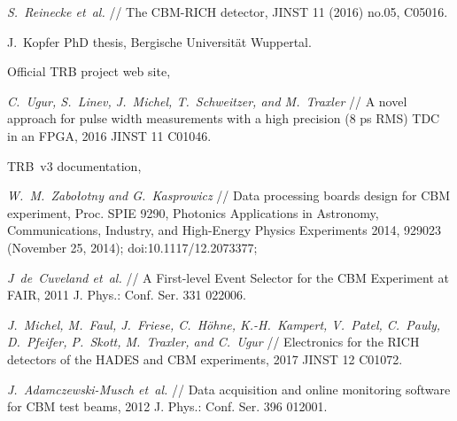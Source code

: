 \begin{thebibliography}{99}
\textit{S.~Reinecke et~al.} //
The CBM-RICH detector,
JINST 11 (2016) no.05, C05016.

J.~Kopfer PhD thesis, Bergische Universit\"{a}t Wuppertal.


Official TRB project web site,

\textit{C.~Ugur, S.~Linev, J.~Michel, T.~Schweitzer, and M.~Traxler} //
A novel approach for pulse width measurements with a high precision (8 ps RMS) TDC in an FPGA,
2016 JINST 11 C01046.



TRB~v3 documentation,

\textit{W.~M.~Zabołotny and G.~Kasprowicz} //
Data processing boards design for CBM experiment,
Proc. SPIE 9290, Photonics Applications in Astronomy, Communications, Industry, and High-Energy Physics Experiments 2014, 929023 (November 25, 2014); doi:10.1117/12.2073377;

\textit{J~de~Cuveland et~al.} //
A First-level Event Selector for the CBM Experiment at FAIR,
2011 J. Phys.: Conf. Ser. 331 022006.

\textit{J.~Michel, M.~Faul, J.~Friese, C.~H\"{o}hne, K.-H.~Kampert, V.~Patel, C.~Pauly, D.~Pfeifer, P.~Skott, M.~Traxler, and C.~Ugur} //
Electronics for the RICH detectors of the HADES and CBM experiments,
2017 JINST 12 C01072.

\textit{J.~Adamczewski-Musch et~al.} //
Data acquisition and online monitoring software for CBM test beams,
2012 J. Phys.: Conf. Ser. 396 012001.



\end{thebibliography}
